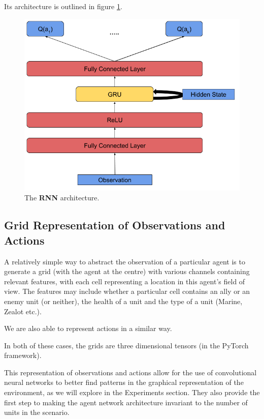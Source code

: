 Its architecture is outlined in figure \ref{fig:RNN_agent_diagram}.

\begin{figure}
    \centering
    \includegraphics[scale=0.45]{images/agent_diagrams/rnn_agent_diagram.png}
    \caption{The \textbf{RNN} architecture.}
    \label{fig:RNN_agent_diagram}
\end{figure}






\subsection{Grid Representation of Observations and Actions}

A relatively simple way to abstract the observation of a particular agent is to generate a grid (with the agent at the centre) with various channels containing relevant features, with each cell representing a location in this agent's field of view. The features may include whether a particular cell contains an ally or an enemy unit (or neither), the health of a unit and the type of a unit (Marine, Zealot etc.). 

We are also able to represent actions in a similar way. 

In both of these cases, the grids are three dimensional tensors (in the PyTorch framework).

This representation of observations and actions allow for the use of convolutional neural networks to better find patterns in the graphical representation of the environment, as we will explore in the Experiments section. They also provide the first step to making the agent network architecture invariant to the number of units in the scenario.

